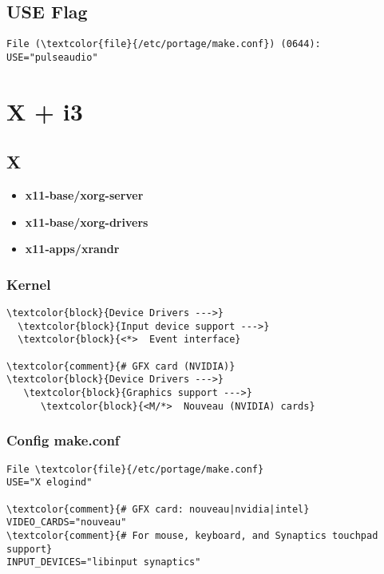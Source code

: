 \documentclass[10pt, a4paper, onecolumn, openany]{book}         %
\begin{document}
\section{USE Flag}
\begin{Verbatim}[commandchars=\\\{\}]
File (\textcolor{file}{/etc/portage/make.conf}) (0644):
USE="pulseaudio"

\end{Verbatim}


\chapter{X + i3}
\section{X}
\begin{itemize}
    \item \textbf{x11-base/xorg-server}
    \item \textbf{x11-base/xorg-drivers}
    \item \textbf{x11-apps/xrandr}
\end{itemize}

\subsection{Kernel}
\begin{Verbatim}[commandchars=\\\{\}]
\textcolor{block}{Device Drivers --->}
  \textcolor{block}{Input device support --->}
  \textcolor{block}{<*>  Event interface}
  
\textcolor{comment}{# GFX card (NVIDIA)}
\textcolor{block}{Device Drivers --->}
   \textcolor{block}{Graphics support --->}
      \textcolor{block}{<M/*>  Nouveau (NVIDIA) cards}
\end{Verbatim}

\subsection{Config make.conf}
\begin{Verbatim}[commandchars=\\\{\}]
File \textcolor{file}{/etc/portage/make.conf}
USE="X elogind"

\textcolor{comment}{# GFX card: nouveau|nvidia|intel}
VIDEO_CARDS="nouveau"
\textcolor{comment}{# For mouse, keyboard, and Synaptics touchpad support}
INPUT_DEVICES="libinput synaptics"
\end{Verbatim}
\end{document}
